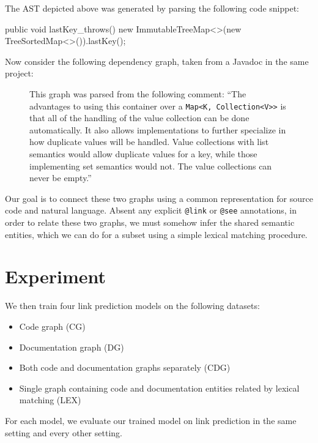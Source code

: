 \documentclass{article}
\begin{document}
\vspace{20pt}

\begin{figure}[H]
    \centering
    
    \label{fig:ast}
\end{figure}

\vspace{-30pt}The AST depicted above was generated by parsing the following code snippet:

\begin{javalisting}
public void lastKey_throws() {
    new ImmutableTreeMap<>(new TreeSortedMap<>()).lastKey();
}
\end{javalisting}

Now consider the following dependency graph, taken from a Javadoc in the same project:

\begin{figure}[H]
    \centering
    
    \caption{This graph was parsed from the following comment:
        ``The advantages to using this container over a \footnotesize\texttt{Map<K, Collection<V>{}>} is
        that all of the handling of the value collection can be done automatically.
        It also allows implementations to further specialize in how duplicate values
        will be handled. Value collections with list semantics would allow
        duplicate values for a key, while those implementing set semantics would not.
        The value collections can never be empty.''
    }
    \label{fig:eng}
\end{figure}

Our goal is to connect these two graphs using a common representation for source code and natural language. Absent any explicit \texttt{@link} or \texttt{@see} annotations, in order to relate these two graphs, we must somehow infer the shared semantic entities, which we can do for a subset using a simple lexical matching procedure.

\section{Experiment}

We then train four link prediction models on the following datasets:

\begin{itemize}
    \item Code graph (CG)
    \item Documentation graph (DG)
    \item Both code and documentation graphs separately (CDG)
    \item Single graph containing code and documentation entities related by lexical matching (LEX)
\end{itemize}

For each model, we evaluate our trained model on link prediction in the same setting and every other setting.

\clearpage
\newpage



\end{document}
